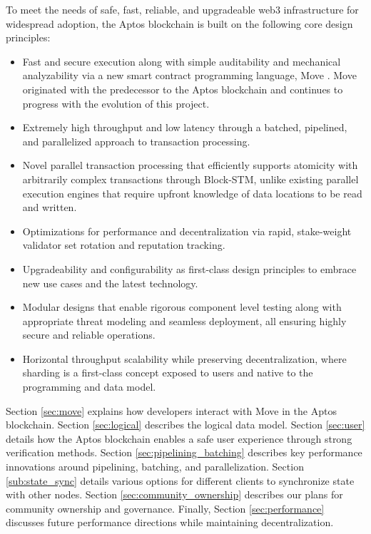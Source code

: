 \documentclass{article}
\begin{document}
To meet the needs of safe, fast, reliable, and upgradeable web3 infrastructure for widespread adoption, the Aptos blockchain is built on the following core design principles:

\begin{itemize}
\item Fast and secure execution along with simple auditability and mechanical analyzability via a new smart contract programming language, Move \cite{move}. Move originated with the predecessor to the Aptos blockchain and continues to progress with the evolution of this project.
\item Extremely high throughput and low latency through a batched, pipelined, and parallelized approach to transaction processing.
\item Novel parallel transaction processing that efficiently supports atomicity with arbitrarily complex transactions through Block-STM, unlike existing parallel execution engines that require upfront knowledge of data locations to be read and written.
\item Optimizations for performance and decentralization via rapid, stake-weight validator set rotation and reputation tracking.
\item Upgradeability and configurability as first-class design principles to embrace new use cases and the latest technology.
\item Modular designs that enable rigorous component level testing along with appropriate threat modeling and seamless deployment, all ensuring highly secure and reliable operations.
\item Horizontal throughput scalability while preserving decentralization, where sharding is a first-class concept exposed to users and native to the programming and data model.
\end{itemize}
Section \ref{sec:move} explains how developers interact with Move in the Aptos blockchain. Section \ref{sec:logical} describes the logical data model. Section \ref{sec:user} details how the Aptos blockchain enables a safe user experience through strong verification methods. Section \ref{sec:pipelining_batching} describes key performance innovations around pipelining, batching, and parallelization. Section \ref{sub:state_sync} details various options for different clients to synchronize state with other nodes. Section \ref{sec:community_ownership} describes our plans for community ownership and governance. Finally, Section \ref{sec:performance} discusses future performance directions while maintaining decentralization.
\end{document}

